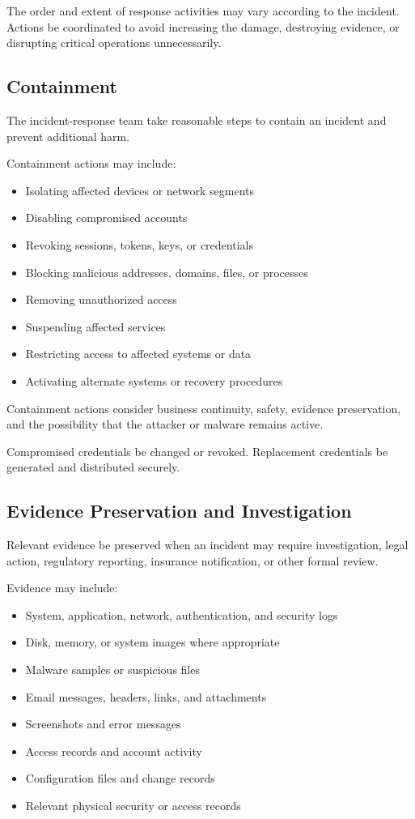 The order and extent of response activities may vary according to the incident. Actions \must{} be coordinated to avoid increasing the damage, destroying evidence, or disrupting critical operations unnecessarily.

\subsection{Containment}

The incident-response team \must{} take reasonable steps to contain an incident and prevent additional harm.

Containment actions may include:
\begin{itemize}
    \item Isolating affected devices or network segments
    \item Disabling compromised accounts
    \item Revoking sessions, tokens, keys, or credentials
    \item Blocking malicious addresses, domains, files, or processes
    \item Removing unauthorized access
    \item Suspending affected services
    \item Restricting access to affected systems or data
    \item Activating alternate systems or recovery procedures
\end{itemize}

Containment actions \must{} consider business continuity, safety, evidence preservation, and the possibility that the attacker or malware remains active.

Compromised credentials \must{} be changed or revoked. Replacement credentials \must{} be generated and distributed securely.

\subsection{Evidence Preservation and Investigation}

Relevant evidence \must{} be preserved when an incident may require investigation, legal action, regulatory reporting, insurance notification, or other formal review.

Evidence may include:
\begin{itemize}
    \item System, application, network, authentication, and security logs
    \item Disk, memory, or system images where appropriate
    \item Malware samples or suspicious files
    \item Email messages, headers, links, and attachments
    \item Screenshots and error messages
    \item Access records and account activity
    \item Configuration files and change records
    \item Relevant physical security or access records
\end{itemize}

